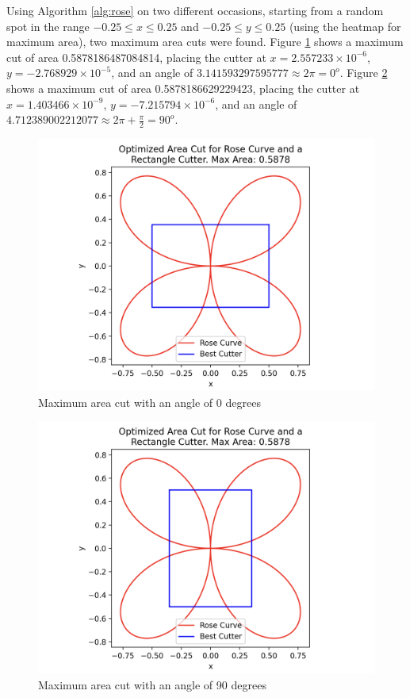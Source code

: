 \documentclass{article}
\begin{document}
Using Algorithm \ref{alg:rose} on two different occasions, starting from a random spot in the range $-0.25 \leq x \leq 0.25$ and $-0.25 \leq y \leq 0.25$ (using the heatmap for maximum area), two maximum area cuts were found. Figure \ref{fig:rose1} shows a maximum cut of area 0.5878186487084814, placing the cutter at $x= 2.557233\times 10^{-6}$, $y=-2.768929\times 10^{-5}$, and an angle of $3.141593297595777 \approx 2\pi=0^o$. Figure \ref{fig:rose2} shows a maximum cut of area 0.5878186629229423, placing the cutter at $x= 1.403466\times 10^{-9}$, $y=-7.215794\times 10^{-6}$, and an angle of $4.712389002212077 \approx 2\pi + \frac{\pi}{2} = 90^o$.
\begin{figure}[hbt!]
    \centering
    \includegraphics[width=0.95\linewidth]{images/rose1.png}
    \caption{Maximum area cut with an angle of 0 degrees}
    \label{fig:rose1}
\end{figure}
\begin{figure}[hbt!]
    \centering
    \includegraphics[width=0.95\linewidth]{images/rose2.png}
    \caption{Maximum area cut with an angle of 90 degrees}
    \label{fig:rose2}
\end{figure}
\end{document}
